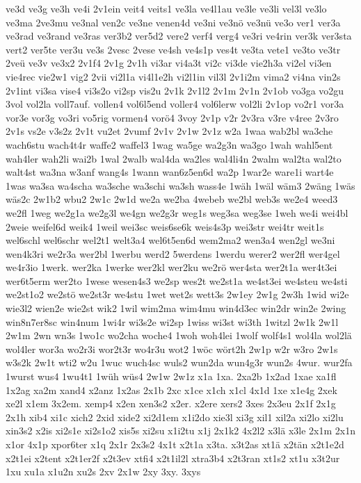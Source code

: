 {ve3d
ve3g
ve3h
ve4i
2v1ein
veit4
veits1
ve3la
ve4l1au
ve3le
ve3li
vel3l
ve3lo
ve3ma
2ve3mu
ve3nal
ven2c
ve3ne
venen4d
ve3ni
ve3nö
ve3nü
ve3o
ver1
ver3a
ve3rad
ve3rand
ve3ras
ver3b2
ver5d2
vere2
verf4
verg4
ve3ri
ve4rin
ver3k
ver3sta
vert2
ver5te
ver3u
ve3s
2vesc
2vese
ve4sh
ve4s1p
ves4t
ve3ta
vete1
ve3to
ve3tr
2veü
ve3v
ve3x2
2v1f4
2v1g
2v1h
vi3ar
vi4a3t
vi2c
vi3de
vie2h3a
vi2el
vi3en
vie4rec
vie2w1
vig2
2vii
vi2l1a
vi4l1e2h
vi2l1in
vil3l
2v1i2m
vima2
vi4na
vin2s
2v1int
vi3sa
vise4
vi3s2o
vi2sp
vis2u
2v1k
2v1l2
2v1m
2v1n
2v1ob
vo3ga
vo2gu
3vol
vol2la
voll7auf.
vollen4
vol6l5end
voller4
vol6lerw
vol2li
2v1op
vo2r1
vor3a
vor3e
vor3g
vo3ri
vo5rig
vormen4
vorö4
3voy
2v1p
v2r
2v3ra
v3re
v4ree
2v3ro
2v1s
vs2e
v3s2z
2v1t
vu2et
2vumf
2v1v
2v1w
2v1z
w2a
1waa
wab2bl
wa3che
wach6stu
wach4t4r
waffe2
waffel3
1wag
wa5ge
wa2g3n
wa3go
1wah
wahl5ent
wah4ler
wah2li
wai2b
1wal
2walb
wal4da
wa2les
wal4li4n
2walm
wal2ta
wal2to
walt4st
wa3na
w3anf
wang4s
1wann
wan6z5en6d
wa2p
1war2e
ware1i
wart4e
1was
wa3sa
wa4scha
wa3sche
wa3schi
wa3sh
wass4e
1wäh
1wäl
wäm3
2wäng
1wäs
wäs2c
2w1b2
wbu2
2w1c
2w1d
we2a
we2ba
4webeb
we2bl
web3s
we2e4
weed3
we2fl
1weg
we2g1a
we2g3l
we4gn
we2g3r
weg1s
weg3sa
weg3se
1weh
we4i
wei4bl
2weie
weifel6d
weik4
1weil
wei3sc
weis6se6k
weis4s3p
wei3str
wei4tr
weit1s
wel6schl
wel6schr
wel2t1
welt3a4
wel6t5en6d
wem2ma2
wen3a4
wen2gl
we3ni
wen4k3ri
we2r3a
wer2bl
1werbu
werd2
5werdens
1werdu
werer2
wer2fl
wer4gel
we4r3io
1werk.
wer2ka
1werke
wer2kl
wer2ku
we2rö
wer4sta
wer2t1a
wer4t3ei
wer6t5erm
wer2to
1wese
wesen4s3
we2sp
wes2t
we2st1a
we4st3ei
we4steu
we4sti
we2st1o2
we2stö
we2st3r
we4stu
1wet
wet2s
wett3s
2w1ey
2w1g
2w3h
1wid
wi2e
wie3l2
wien2e
wie2st
wik2
1wil
wim2ma
wim4mu
win4d3ec
win2dr
win2e
2wing
win8n7er8sc
win4num
1wi4r
wi3s2e
wi2sp
1wiss
wi3st
wi3th
1witzl
2w1k
2w1l
2w1m
2wn
wn3s
1wo1c
wo2cha
woche4
1woh
woh4lei
1wolf
wolf4s1
wol4la
wol2lä
wol4ler
wor3a
wo2r3i
wor2t3r
wo4r3u
wot2
1wöc
wört2h
2w1p
w2r
w3ro
2w1s
w3s2k
2w1t
wti2
w2u
1wuc
wuch4sc
wuls2
wun2da
wun4g3r
wun2s
4wur.
wur2fa
1wurst
wus4
1wu4t1
1wüh
wüs4
2w1w
2w1z
x1a
1xa.
2xa2b
1x2ad
1xae
xa1fl
1x2ag
xa2m
xand4
x2anz
1x2as
2x1b
2xc
x1ce
x1ch
x1cl
4x1d
1xe
x1e4g
2xek
xe2l
x1em
3x2em.
xemp4
x2en
xen3s2
x2er.
x2ere
xers2
3xes
2x3eu
2x1f
2x1g
2x1h
xib4
xi1c
xich2
2xid
xide2
xi2d1em
x1i2do
xie3l
xi3g
xil1
xil2a
xi2lo
xi2lu
xin3s2
x2is
xi2s1e
xi2s1o2
xis5s
xi2su
x1i2tu
x1j
2x1k2
4x2l2
x3lä
x3le
2x1m
2x1n
x1or
4x1p
xpor6ter
x1q
2x1r
2x3s2
4x1t
x2t1a
x3ta.
x3t2as
xt1ä
x2tän
x2t1e2d
x2t1ei
x2tent
x2t1er2f
x2t3ev
xtfi4
x2t1il2l
xtra3b4
x2t3ran
xt1s2
xt1u
x3t2ur
1xu
xu1a
x1u2n
xu2s
2xv
2x1w
2xy
3xy.
3xys
}
